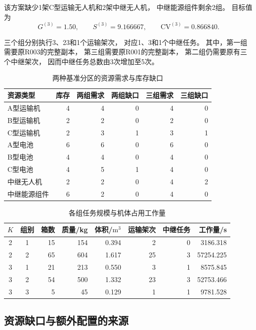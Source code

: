 \documentclass[bwprint]{gmcmthesis}
\begin{document}
该方案缺少1架C型运输无人机和2架中继无人机，
中继能源组件剩余2组。
目标值为
\begin{equation}
G^{(3)}=1.50,\qquad
S^{(3)}=9.166667,\qquad
\mathrm{CV}^{(3)}=0.866840.
\end{equation}

三个组分别执行3、23和1个运输架次，
对应1、3和1个中继任务。
其中，第一组需要原R003的完整副本，
第三组需要原R001的完整副本，
第二组仍需要原有三个中继架次，
因而中继任务总数由3次增加至5次。

\begin{table}[htbp]
\centering
\caption{两种基准分区的资源需求与库存缺口}
\label{tab:q4_resources}
\begin{tabular}{lrrrrr}
\toprule
资源类型 & 库存 & 两组需求 & 两组缺口 & 三组需求 & 三组缺口\\
\midrule
A型运输机 &4&4&0&4&0\\
B型运输机 &2&2&0&2&0\\
C型运输机 &2&3&1&3&1\\
A型电池   &6&6&0&6&0\\
B型电池   &4&4&0&4&0\\
C型电池   &4&5&1&4&0\\
中继无人机 &2&2&0&4&2\\
中继能源组件 &6&2&0&4&0\\
\bottomrule
\end{tabular}
\end{table}

\begin{table}[htbp]
\centering
\caption{各组任务规模与机体占用工作量}
\label{tab:q4_workload}
\small
\begin{tabular}{ccrrrrrr}
\toprule
$K$ & 组别 & 箱数 & 质量/kg & 体积/$\mathrm{m}^3$
& 运输架次 & 中继任务 & 工作量/s\\
\midrule
2&1&15&154&0.394&2&0&3186.318\\
2&2&65&604&1.617&25&3&57254.225\\
\midrule
3&1&21&213&0.550&3&1&8575.845\\
3&2&54&500&1.332&23&3&52753.466\\
3&3&5&45&0.129&1&1&9781.528\\
\bottomrule
\end{tabular}
\end{table}

\subsection{资源缺口与额外配置的来源}
\end{document}
